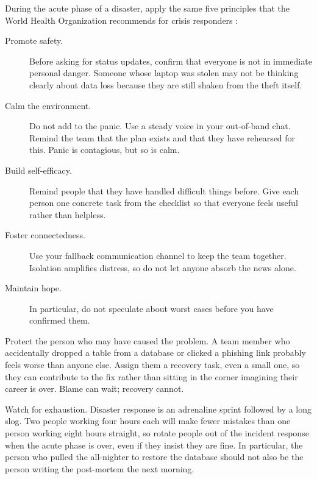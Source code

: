 \documentclass[10pt,letterpaper]{article}
\begin{document}
During the acute phase of a disaster, apply the same five principles that the
World Health Organization recommends for crisis responders \cite{who2026}:

\begin{description}

\item[Promote safety.]
  Before asking for status updates, confirm that everyone is not in immediate
  personal danger.  Someone whose laptop was stolen may not be thinking clearly
  about data loss because they are still shaken from the theft itself.

\item[Calm the environment.]
  Do not add to the panic.  Use a steady voice in your out-of-band chat.  Remind
  the team that the plan exists and that they have rehearsed for this.  Panic is
  contagious, but so is calm.

\item[Build self-efficacy.]
  Remind people that they have handled difficult things before.  Give each person
  one concrete task from the checklist so that everyone feels useful rather than
  helpless.

\item[Foster connectedness.]
  Use your fallback communication channel to keep the team together.  Isolation
  amplifies distress, so do not let anyone absorb the news alone.

\item[Maintain hope.]
  In particular, do not speculate about worst cases before you have confirmed
  them.

\end{description}

Protect the person who may have caused the problem.  A team member who
accidentally dropped a table from a database or clicked a phishing link probably
feels worse than anyone else.  Assign them a recovery task, even a small one, so
they can contribute to the fix rather than sitting in the corner imagining their
career is over.  Blame can wait; recovery cannot.

Watch for exhaustion.  Disaster response is an adrenaline sprint followed by a
long slog.  Two people working four hours each will make fewer mistakes than one
person working eight hours straight, so rotate people out of the incident
response when the acute phase is over, even if they insist they are fine.  In
particular, the person who pulled the all-nighter to restore the database should
not also be the person writing the post-mortem the next morning.
\end{document}
